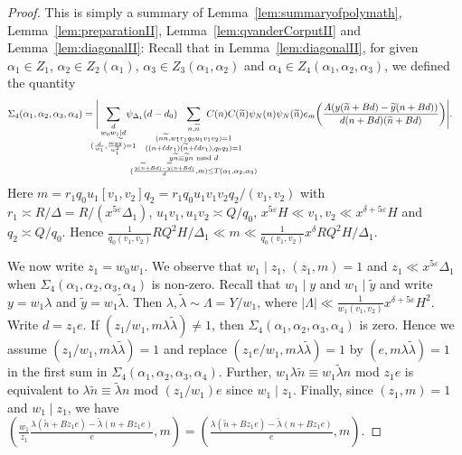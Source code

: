 \documentclass{amsart}
\numberwithin{equation}{section}
\begin{document}
\begin{proof}
This is simply a summary of Lemma~\ref{lem:summaryofpolymath}, Lemma~\ref{lem:preparationII}, Lemma~\ref{lem:qvanderCorputII} and Lemma~\ref{lem:diagonalII}: 
Recall that in Lemma~\ref{lem:diagonalII}, for given $\alpha_1 \in Z_1$, $\alpha_2 \in Z_2(\alpha_1)$, $\alpha_3 \in Z_3(\alpha_1,\alpha_2)$ and $\alpha_4 \in Z_4(\alpha_1,\alpha_2,\alpha_3)$, we defined the quantity 
\begin{align*}
&\Sigma_4(\alpha_1,\alpha_2,\alpha_3,\alpha_4)= \Bigg|\!\!\!\!\!\!\sum_{\substack{d \\ w_0w_1 \mid d  \\  (\frac{d}{w_1}, \frac{my\widetilde{y}}{w_1^2})=1}}\!\!\!\!\!\!\!\psi_{\Delta_1}(d-d_0) \!\!\!\!\!\!\!\!\!\!\!\!\!\!\!\!\!\!\!\!\!\!\!\!\!\!\!\!\!\!\sum_{\substack{n, \widetilde{n} \\ (n\widetilde{n},w_1 r_1 q_0 u_1 v_1 v_2)=1 \\ ((n+\ell dr_1)(\widetilde{n}+\ell d r_1), q_0q_2)=1  \\ y\widetilde{n} \equiv 
\widetilde{y}n  \mbox{ \scriptsize mod } d \\ (\frac{y (\widetilde{n} +Bd)-\widetilde{y}(n+Bd)}{d},m ) \leq T(\alpha_1,\alpha_2,\alpha_3)}}  \!\!\!\!\!\!\!\!\!\!\!\!\!\!\!\!\!\!\!\!\!\!\!\!\!\!\!\!\!\!\!\! C(n)  C(\widetilde{n})\psi_N(n)\psi_N(\widetilde{n}) e_{m}\!\left(\dfrac{A (y(\widetilde{n}+B d)-  \widetilde{y}(n+B d))}{d(n+B d)(\widetilde{n}+B d)}\right)\!\Bigg|.
\end{align*}
Here $m=r_1q_0u_1[v_1,v_2]q_2=r_1q_0u_1v_1v_2q_2/(v_1,v_2)$ with $r_1 \asymp R/\Delta=R/(x^{5\varepsilon}\Delta_1)$, $u_1v_1, u_1v_2 \asymp Q/q_0$, $x^{5\varepsilon}H \ll v_1,v_2 \ll x^{\delta+5\varepsilon}H$ and $q_2 \asymp Q/q_0$. Hence $\frac{1}{q_0 (v_1,v_2)}RQ^2H/\Delta_1 \ll m \ll \frac{1}{q_0 (v_1,v_2)}x^{\delta}RQ^2H/\Delta_1$. 

\vspace{3mm}
We now   write  $z_1 = w_0w_1$.  We  observe that $w_1 \mid z_1$, $(z_1,m)=1$ and $z_1 \ll x^{5\varepsilon}\Delta_1$ when $\Sigma_4(\alpha_1,\alpha_2,\alpha_3,\alpha_4)$ is non-zero. Recall that $w_1 \mid y$ and $w_1 \mid \widetilde{y}$ and write $y = w_1 \lambda$ and $\widetilde{y} = w_1 \widetilde{\lambda}$. Then $\lambda, \widetilde{\lambda} \sim \Lambda = Y/w_1$, where $|\Lambda| \ll  \tfrac{1}{w_1(v_1,v_2)}x^{\delta+5\varepsilon}H^2$.  Write $d = z_1 e$. 
If $(z_1/w_1,m\lambda\widetilde{\lambda}) \neq 1$, then $\Sigma_4(\alpha_1,\alpha_2,\alpha_3,\alpha_4)$ is zero. Hence we  assume $(z_1/w_1,m\lambda\widetilde{\lambda}) =1$ and replace $(z_1e/w_1, m\lambda\widetilde{\lambda})=1$ by $(e, m\lambda\widetilde{\lambda})=1$ in the first sum in $\Sigma_4(\alpha_1,\alpha_2,\alpha_3,\alpha_4)$. Further, $w_1 \lambda \widetilde{n} \equiv 
w_1 \widetilde{\lambda} n $ mod $z_1 e$ is equivalent to $\lambda \widetilde{n} \equiv 
 \widetilde{\lambda} n $ mod $ (z_1/w_1) e$ since $w_1 \mid z_1$. Finally, since $(z_1,m)=1$ and $w_1 \mid z_1$, we have $(\frac{w_1}{z_1}\frac{ \lambda (\widetilde{n} +Bz_1 e)- \widetilde{\lambda}(n+B z_1 e)}{e},m ) =  (\frac{ \lambda (\widetilde{n} +Bz_1 e)- \widetilde{\lambda}(n+B z_1 e)}{e},m ) $. 


\end{proof}
\end{document}
